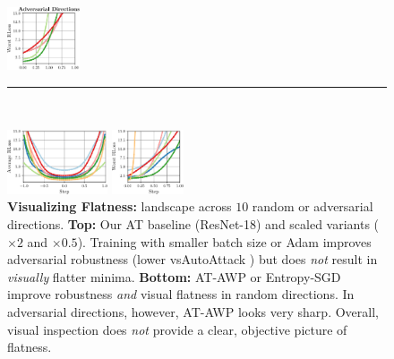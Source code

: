 \begin{figure}[t]
\begin{minipage}[t]{0.29\textwidth}
\begin{minipage}[t]{0.3\textwidth}
			\includegraphics[height=1.85cm]{plots_main_adversarial}
		\end{minipage}
		
		{\rule{5.5cm}{0.25px}}
		\\[-9px]
		\begin{minipage}[t]{0.625\textwidth}
			\vspace*{0px}
			
			\includegraphics[height=1.9cm]{plots_main_random2}
		\end{minipage}
		\begin{minipage}[t]{0.3\textwidth}
			\vspace*{0px}
			
			\includegraphics[height=1.9cm]{plots_main_adversarial2}
		\end{minipage}
	\end{minipage}
	
	\vspace*{-10px}
	\caption{\textbf{Visualizing Flatness:} \RCE landscape across $10$ random or adversarial directions. \textbf{Top:} Our AT baseline (ResNet-18) and scaled variants ($\times2$ and $\times0.5$). Training with smaller batch size or Adam \cite{KingmaICLR2015} improves adversarial robustness (lower \RTE vs\onedot AutoAttack \cite{CroceICML2020}) but does \emph{not} result in \emph{visually} flatter minima. \textbf{Bottom:} AT-AWP \cite{WuNIPS2020} or Entropy-SGD \cite{ChaudhariICLR2017} improve robustness \emph{and} visual flatness in random directions. In adversarial directions, however, AT-AWP looks very sharp. Overall, visual inspection does \emph{not} provide a clear, objective picture of flatness.}
	\label{fig:main}
	\vspace*{-6px}
\end{figure}
